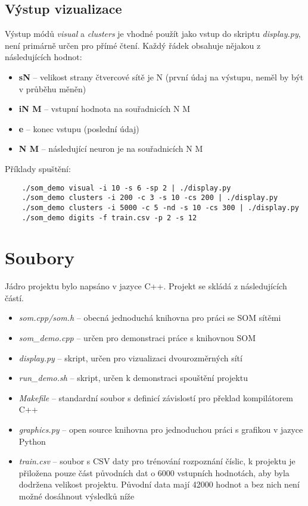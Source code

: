 \documentclass[11pt]{article}
\begin{document}
\subsection*{Výstup vizualizace}
Výstup módů \textit{visual} a \textit{clusters} je vhodné použít jako vstup do skriptu \textit{display.py}, není primárně určen pro přímé čtení. Každý řádek obsahuje nějakou z následujících hodnot:

\begin{itemize}
	\item \textbf{sN} -- velikost strany čtvercové sítě je N (první údaj na výstupu, neměl by být v průběhu měněn)
	\item \textbf{iN M} -- vstupní hodnota na souřadnicích N M
	\item \textbf{e} -- konec vstupu (poslední údaj)
	\item \textbf{N M} -- následující neuron je na souřadnicích N M
\end{itemize}

Příklady spuštění:
\begin{commandline}
	\begin{verbatim}
	./som_demo visual -i 10 -s 6 -sp 2 | ./display.py
	./som_demo clusters -i 200 -c 3 -s 10 -cs 200 | ./display.py
	./som_demo clusters -i 5000 -c 5 -nd -s 10 -cs 300 | ./display.py 
	./som_demo digits -f train.csv -p 2 -s 12
	\end{verbatim}
\end{commandline}

\section*{Soubory}
Jádro projektu bylo napsáno v jazyce C++. Projekt se skládá z následujících částí. 

\begin{itemize}
	\item \textit{som.cpp/som.h} -- obecná jednoduchá knihovna pro práci se SOM sítěmi
    \item \textit{som\_demo.cpp} -- určen pro demonstraci práce s knihovnou SOM
    \item \textit{display.py} -- skript, určen pro vizualizaci dvourozměrných sítí
    \item \textit{run\_demo.sh} -- skript, určen k demonstraci spouštění projektu
    \item \textit{Makefile} -- standardní soubor s definicí závislostí pro překlad kompilátorem C++ 
    \item \textit{graphics.py} -- open source knihovna pro jednoduchou práci s grafikou v jazyce Python
    \item \textit{train.csv} -- soubor s CSV daty pro trénování rozpoznání číslic, k projektu je přiložena pouze část původních dat o 6000 vstupních hodnotách, aby byla dodržena velikost projektu. Původní data mají 42000 hodnot a bez nich není možné dosáhnout výsledků níže
\end{itemize}
	
\end{document}
